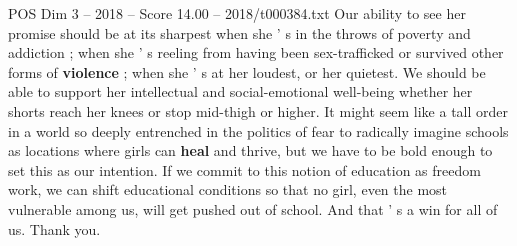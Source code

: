 \begin{textsample}{POS Dim 3 – 2018 – Score 14.00 – 2018/t000384.txt}
Our ability to see her promise should be at its sharpest when she ' s in the throws of poverty and addiction ; when she ' s reeling from having been sex-trafficked or survived other forms of \textbf{violence} ; when she ' s at her loudest, or her quietest.
We should be able to support her intellectual and social-emotional well-being whether her shorts reach her knees or stop mid-thigh or higher.
It might seem like a tall order in a world so deeply entrenched in the politics of fear to radically imagine schools as locations where girls can \textbf{heal} and thrive, but we have to be bold enough to set this as our intention.
If we commit to this notion of education as freedom work, we can shift educational conditions so that no girl, even the most vulnerable among us, will get pushed out of school.
And that ' s a win for all of us.
Thank you.

\end{textsample}
